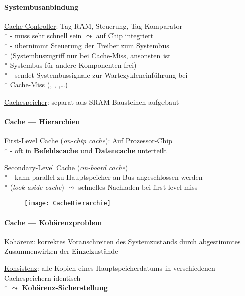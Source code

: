 \paragraph{Systembusanbindung}
\begin{items}
	\item \underline{Cache-Controller}: Tag-RAM, Steuerung, Tag-Komparator \\*
		- muss sehr schnell sein \( \leadsto \) auf Chip integriert \\*
		- übernimmt Steuerung der Treiber zum Systembus \\* \phantom{-} (Systembuszugriff nur bei Cache-Miss, ansonsten ist \\* \phantom{-} Systembus für andere Komponenten frei) \\*
		- sendet Systembussignale zur Wartezykleneinführung bei \\* \phantom{-} Cache-Miss (, , ,\dots)
	\item \underline{Cachespeicher}: separat aus SRAM-Bausteinen aufgebaut
\end{items}

\paragraph{Cache --- Hierarchien}
\begin{items}
	\item \underline{First-Level Cache} (\emph{on-chip cache}): Auf Prozessor-Chip \\*
		- oft in \textbf{Befehlscache} und \textbf{Datencache} unterteilt
	\item \underline{Secondary-Level Cache} (\emph{on-board cache}) \\*
		- kann parallel zu Hauptspeicher an Bus angeschlossen werden \\* \phantom{-} (\emph{look-aside cache}) \( \leadsto \) schnelles Nachladen bei first-level-miss
\end{items}
\begin{figure}[H]\centering\label{CacheHierarchie}\texttt{[image: CacheHierarchie]}\end{figure}

\paragraph{Cache --- Kohärenzproblem}
\begin{items}
	\item \underline{Kohärenz}: korrektes Voranschreiten des Systemzustands durch abgestimmtes Zusammenwirken der Einzelzustände
	\item \underline{Konsistenz}: alle Kopien eines Hauptspeicherdatums in verschiedenen Cachespeichern identisch \\* \( \leadsto \) \textbf{Kohärenz-Sicherstellung}
\end{items}

